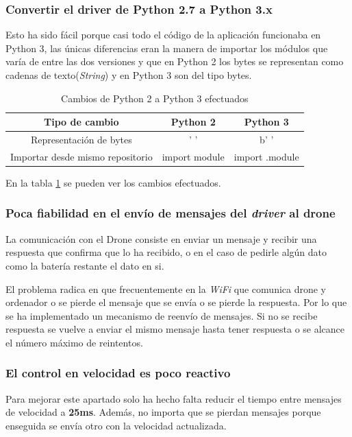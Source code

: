 \subsubsection*{Convertir el \textbf{driver} de Python 2.7 a Python 3.x}
Esto ha sido fácil porque casi todo el código de la aplicación funcionaba en Python 3, las únicas diferencias eran la manera de importar los módulos que varía de entre las dos versiones y que en Python 2 los bytes se representan como cadenas de texto(\textit{String}) y en Python 3 son del tipo bytes.
\begin{table}[H]
\centering
\begin{tabular}{|c|c|c|}
\hline
\textbf{Tipo de cambio}          & \textbf{Python 2} & \textbf{Python 3} \\ \hline
Representación de bytes          & ' '               & b' '              \\ \hline
Importar desde mismo repositorio & import module     & import .module    \\ \hline
\end{tabular}
\caption{Cambios de Python 2 a Python 3 efectuados}
\label{tab:cambios_python_2_3}
\end{table}

En la tabla \ref{tab:cambios_python_2_3} se pueden ver los cambios efectuados.

\subsubsection*{Poca fiabilidad en el envío de mensajes del \textit{driver} al drone}
La comunicación con el Drone consiste en enviar un mensaje y recibir una respuesta que confirma que lo ha recibido, o en el caso de pedirle algún dato como la batería restante el dato en si.

El problema radica en que frecuentemente en la \textit{WiFi} que comunica drone y ordenador o se pierde el mensaje que se envía o  se pierde la respuesta. Por lo que se ha implementado un mecanismo de reenvío de mensajes. Si no se recibe respuesta se vuelve a enviar el mismo mensaje hasta tener respuesta o se alcance el número máximo de reintentos.

\subsubsection*{El control en velocidad es poco reactivo}
 Para mejorar este apartado solo ha hecho falta reducir el tiempo entre mensajes de velocidad a \textbf{25ms}. Además, no importa que se pierdan mensajes porque enseguida se envía otro con la velocidad actualizada.

